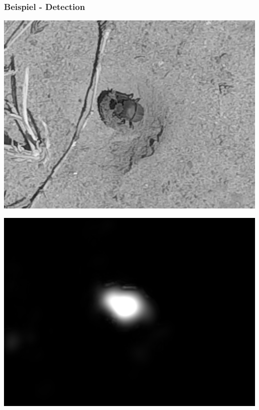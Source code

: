 \begin{frame}
	\frametitle{Beispiel - Detection}
	\begin{minipage}{0.49\textwidth}
		\includegraphics[width=\linewidth]{../Pictures/preferred_1_original.png}
	\end{minipage}
	\begin{minipage}{0.49\textwidth}
		\includegraphics[width=\linewidth]{../Pictures/preferred_1_detection.png}
	\end{minipage}
\end{frame}


